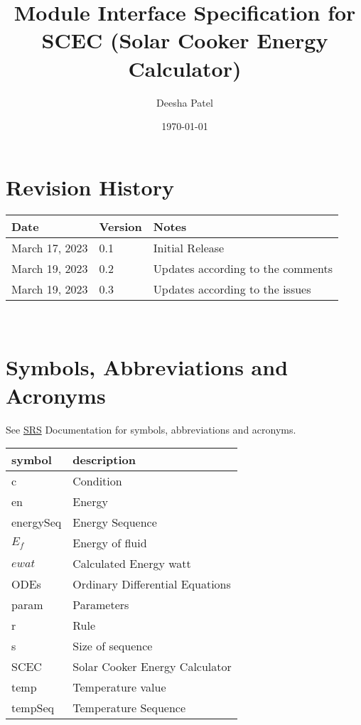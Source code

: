 \documentclass[12pt, titlepage]{article}
\begin{document}
\title{Module Interface Specification for SCEC (Solar Cooker Energy Calculator)}

\author{Deesha Patel}

\date{\today}

\maketitle


\section{Revision History}

\begin{tabularx}{\textwidth}{p{3cm}p{2cm}X}
\toprule {\bf Date} & {\bf Version} & {\bf Notes}\\
\midrule
March 17, 2023 & 0.1 & Initial Release\\
March 19, 2023 & 0.2 & Updates according to the comments \\ 
March 19, 2023 & 0.3 & Updates according to the issues \\ 
\bottomrule
\end{tabularx}

~\newpage

\section{Symbols, Abbreviations and Acronyms}

See \href{https://github.com/DeeshaPatel/CAS-741-Solar-Cooker/blob/c7cc1be3611cae9110b84940b64ef40c7d29aa02/docs/SRS/SRS.pdf}{SRS} Documentation for symbols, abbreviations and acronyms. \\ 

\renewcommand{\arraystretch}{1.2}
\begin{tabular}{l l} 
  \toprule		
  \textbf{symbol} & \textbf{description}\\
  \midrule 
  c & Condition\\
  en & Energy \\
  energySeq & Energy Sequence\\
  $E_f$ & Energy of fluid \\
  $ewat$ & Calculated Energy watt \\ 
  ODEs & Ordinary Differential Equations \\ 
  param & Parameters\\
  r & Rule  \\
  s & Size of sequence \\
  SCEC & Solar Cooker Energy Calculator \\
  temp & Temperature value \\
  tempSeq & Temperature Sequence \\
  \bottomrule
\end{tabular}\\
\end{document}
